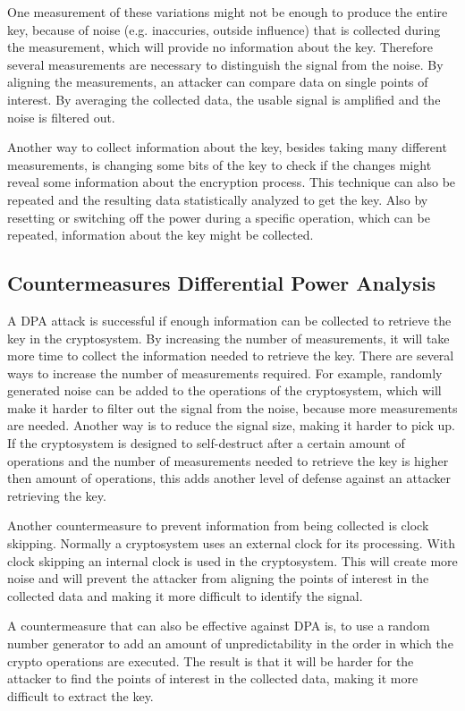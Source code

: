 One measurement of these variations might not be enough to produce the entire key, because of noise (e.g. inaccuries, outside influence) that is collected during the measurement, which will provide no information about the key.
Therefore several measurements are necessary to distinguish the signal from the noise.
By aligning the measurements, an attacker can compare data on single points of interest.
By averaging the collected data, the usable signal is amplified and the noise is filtered out.

Another way to collect information about the key, besides taking many different measurements, is changing some bits of the key to check if the changes might reveal some information about the encryption process.
This technique can also be repeated and the resulting data statistically analyzed to get the key.
Also by resetting or switching off the power during a specific operation, which can be repeated, information about the key might be collected. \cite{kocher2009differential}

\subsection{Countermeasures Differential Power Analysis}
A DPA attack is successful if enough information can be collected to retrieve the key in the cryptosystem.
By increasing the number of measurements, it will take more time to collect the information needed to retrieve the key. 
There are several ways to increase the number of measurements required.
For example, randomly generated noise can be added to the operations of the cryptosystem, which will make it harder to filter out the signal from the noise, because more measurements are needed.
Another way is to reduce the signal size, making it harder to pick up. 
If the cryptosystem is designed to self-destruct after a certain amount of operations and the number of measurements needed to retrieve the key is higher then amount of operations, this adds another level of defense against an attacker retrieving the key.

Another countermeasure to prevent information from being collected is clock skipping.
Normally a cryptosystem uses an external clock for its processing.
With clock skipping an internal clock is used in the cryptosystem.
This will create more noise and will prevent the attacker from aligning the points of interest in the collected data and making it more difficult to identify the signal. 

A countermeasure that can also be effective against DPA is, to use a random number generator to add an amount of unpredictability in the order in which the crypto operations are executed.
The result is that it will be harder for the attacker to find the points of interest in the collected data, making it more difficult to extract the key. \cite{kocher2009differential}


